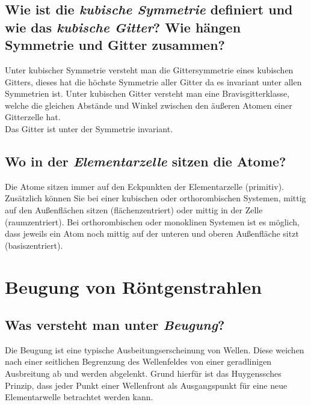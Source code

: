 \subsection*{Wie ist die \textit{kubische Symmetrie} definiert und wie das \textit{kubische Gitter}? Wie hängen Symmetrie und Gitter zusammen?}
Unter kubischer Symmetrie versteht man die Gittersymmetrie eines kubischen Gitters, dieses hat die höchste Symmetrie aller Gitter da es invariant unter allen Symmetrien ist.
Unter kubischen Gitter versteht man eine Bravisgitterklasse, welche die gleichen Abstände und Winkel zwischen den äußeren Atomen einer Gitterzelle hat.\\
Das Gitter ist unter der Symmetrie invariant.
\subsection*{Wo in der \textit{Elementarzelle} sitzen die Atome?}
Die Atome sitzen immer auf den Eckpunkten der Elementarzelle (primitiv).
Zusätzlich können Sie bei einer kubischen oder orthorombischen Systemen, mittig auf den Außenflächen sitzen (flächenzentriert) oder mittig in der Zelle (raumzentriert).
Bei orthorombischen oder monoklinen Systemen ist es möglich, dass jeweils ein Atom noch mittig auf der unteren und oberen Außenfläche sitzt (basiszentriert).
\section{Beugung von Röntgenstrahlen}
\subsection*{Was versteht man unter \textit{Beugung}?}
Die Beugung ist eine typische Ausbeitungserscheinung von Wellen.
Diese weichen nach einer seitlichen Begrenzung des Wellenfeldes von einer geradlinigen Ausbreitung ab und werden abgelenkt.
Grund hierfür ist das Huygenssches Prinzip, dass jeder Punkt einer Wellenfront als Ausgangspunkt für eine neue Elementarwelle betrachtet werden kann. \cite{EKS}
